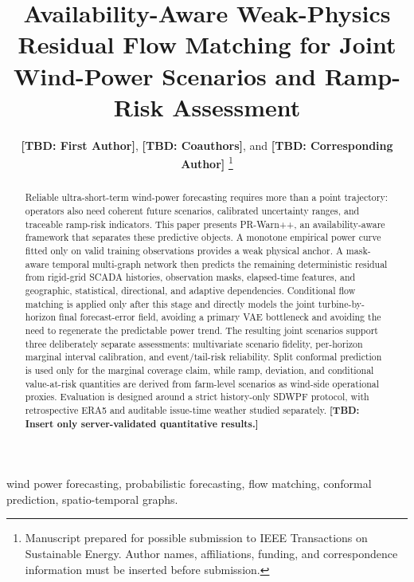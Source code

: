 \documentclass[journal]{IEEEtran}
\newcommand{\TODO}[1]{\textbf{[TBD: #1]}}
\begin{document}
\title{Availability-Aware Weak-Physics Residual Flow Matching for Joint Wind-Power Scenarios and Ramp-Risk Assessment}

\author{\TODO{First Author}, \TODO{Coauthors}, and \TODO{Corresponding Author}%
\thanks{Manuscript prepared for possible submission to IEEE Transactions on Sustainable Energy. Author names, affiliations, funding, and correspondence information must be inserted before submission.}%
}

\maketitle

\begin{abstract}
Reliable ultra-short-term wind-power forecasting requires more than a point trajectory: operators also need coherent future scenarios, calibrated uncertainty ranges, and traceable ramp-risk indicators. This paper presents PR-Warn++, an availability-aware framework that separates these predictive objects. A monotone empirical power curve fitted only on valid training observations provides a weak physical anchor. A mask-aware temporal multi-graph network then predicts the remaining deterministic residual from rigid-grid SCADA histories, observation masks, elapsed-time features, and geographic, statistical, directional, and adaptive dependencies. Conditional flow matching is applied only after this stage and directly models the joint turbine-by-horizon final forecast-error field, avoiding a primary VAE bottleneck and avoiding the need to regenerate the predictable power trend. The resulting joint scenarios support three deliberately separate assessments: multivariate scenario fidelity, per-horizon marginal interval calibration, and event/tail-risk reliability. Split conformal prediction is used only for the marginal coverage claim, while ramp, deviation, and conditional value-at-risk quantities are derived from farm-level scenarios as wind-side operational proxies. Evaluation is designed around a strict history-only SDWPF protocol, with retrospective ERA5 and auditable issue-time weather studied separately. \TODO{Insert only server-validated quantitative results.}
\end{abstract}

\begin{IEEEkeywords}
wind power forecasting, probabilistic forecasting, flow matching, conformal prediction, spatio-temporal graphs.
\end{IEEEkeywords}
\end{document}

